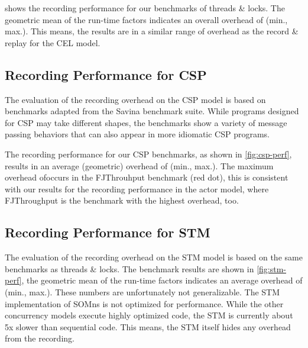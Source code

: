 \documentclass[a4paper,UKenglish,cleveref,autoref]{lipics-v2019}
\def\SOMns{SOM{\sc ns}\xspace}
\begin{document}
 shows the recording performance
for our benchmarks of threads \& locks.
The geometric mean of the run-time factors
indicates an overall overhead of\MutexAvgOverheadP
(min.\MutexMinOverheadP, max.\MutexMaxOverheadP).
%
%
This means, the results are in a similar
range of overhead as the record \& replay
for the CEL model.


\subsection{Recording Performance for CSP}

The evaluation of the recording overhead on the CSP model is based on benchmarks adapted from
the Savina benchmark suite.
While programs designed for CSP may take different shapes,
the benchmarks show a variety of message passing behaviors
that can also appear in more idiomatic CSP programs.

The recording performance for our CSP benchmarks,
as shown in \cref{fig:csp-perf},
results in an average (geometric) overhead of\CSPAvgOverheadP
(min.\CSPMinOverheadP, max.\CSPMaxOverheadP).
%
The maximum overhead of\CSPMaxOverheadP occurs 
in the FJThrouhput benchmark (red dot),
this is consistent with our results
for the recording performance in the actor model,
where FJThroughput is the benchmark with the
highest overhead, too.


\subsection{Recording Performance for STM}

The evaluation of the recording overhead on the STM model is based on the same benchmarks
as threads \& locks.
The benchmark results are shown in \cref{fig:stm-perf},
the geometric mean of the run-time factors
indicates an average overhead of\STMAvgOverheadP
(min.\STMMinOverheadP, max.\STMMaxOverheadP).
%
These numbers are unfortunately not generalizable.
The STM implementation of \SOMns is not optimized for performance.
While the other concurrency models execute highly optimized code,
the STM is currently about 5x slower than sequential code.
This means, the STM itself hides any overhead from the recording.
\end{document}
